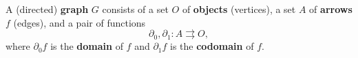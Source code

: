 A (directed) \textbf{graph} $G$ consists of a set $O$ of \textbf{objects} (vertices), a set $A$ of \textbf{arrows} $f$ (edges), and a pair of functions
$$\partial_0, \partial_1: A \rightrightarrows O,$$
where $\partial_0 f$ is the \textbf{domain} of $f$ and $\partial_1 f$ is the \textbf{codomain} of $f$.
